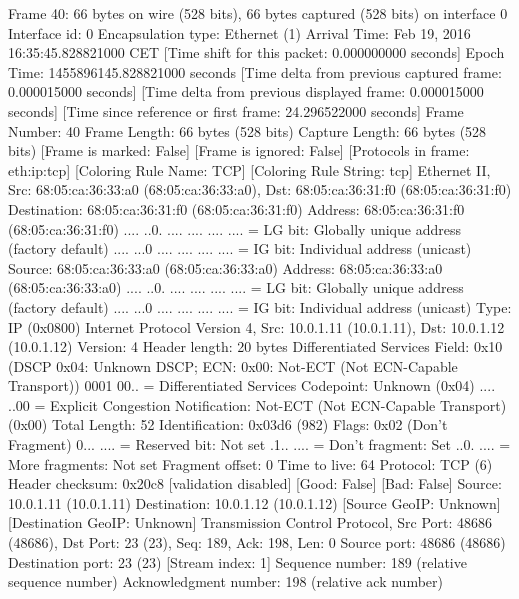 Frame 40: 66 bytes on wire (528 bits), 66 bytes captured (528 bits) on interface 0
    Interface id: 0
    Encapsulation type: Ethernet (1)
    Arrival Time: Feb 19, 2016 16:35:45.828821000 CET
    [Time shift for this packet: 0.000000000 seconds]
    Epoch Time: 1455896145.828821000 seconds
    [Time delta from previous captured frame: 0.000015000 seconds]
    [Time delta from previous displayed frame: 0.000015000 seconds]
    [Time since reference or first frame: 24.296522000 seconds]
    Frame Number: 40
    Frame Length: 66 bytes (528 bits)
    Capture Length: 66 bytes (528 bits)
    [Frame is marked: False]
    [Frame is ignored: False]
    [Protocols in frame: eth:ip:tcp]
    [Coloring Rule Name: TCP]
    [Coloring Rule String: tcp]
Ethernet II, Src: 68:05:ca:36:33:a0 (68:05:ca:36:33:a0), Dst: 68:05:ca:36:31:f0 (68:05:ca:36:31:f0)
    Destination: 68:05:ca:36:31:f0 (68:05:ca:36:31:f0)
        Address: 68:05:ca:36:31:f0 (68:05:ca:36:31:f0)
        .... ..0. .... .... .... .... = LG bit: Globally unique address (factory default)
        .... ...0 .... .... .... .... = IG bit: Individual address (unicast)
    Source: 68:05:ca:36:33:a0 (68:05:ca:36:33:a0)
        Address: 68:05:ca:36:33:a0 (68:05:ca:36:33:a0)
        .... ..0. .... .... .... .... = LG bit: Globally unique address (factory default)
        .... ...0 .... .... .... .... = IG bit: Individual address (unicast)
    Type: IP (0x0800)
Internet Protocol Version 4, Src: 10.0.1.11 (10.0.1.11), Dst: 10.0.1.12 (10.0.1.12)
    Version: 4
    Header length: 20 bytes
    Differentiated Services Field: 0x10 (DSCP 0x04: Unknown DSCP; ECN: 0x00: Not-ECT (Not ECN-Capable Transport))
        0001 00.. = Differentiated Services Codepoint: Unknown (0x04)
        .... ..00 = Explicit Congestion Notification: Not-ECT (Not ECN-Capable Transport) (0x00)
    Total Length: 52
    Identification: 0x03d6 (982)
    Flags: 0x02 (Don't Fragment)
        0... .... = Reserved bit: Not set
        .1.. .... = Don't fragment: Set
        ..0. .... = More fragments: Not set
    Fragment offset: 0
    Time to live: 64
    Protocol: TCP (6)
    Header checksum: 0x20c8 [validation disabled]
        [Good: False]
        [Bad: False]
    Source: 10.0.1.11 (10.0.1.11)
    Destination: 10.0.1.12 (10.0.1.12)
    [Source GeoIP: Unknown]
    [Destination GeoIP: Unknown]
Transmission Control Protocol, Src Port: 48686 (48686), Dst Port: 23 (23), Seq: 189, Ack: 198, Len: 0
    Source port: 48686 (48686)
    Destination port: 23 (23)
    [Stream index: 1]
    Sequence number: 189    (relative sequence number)
    Acknowledgment number: 198    (relative ack number)
